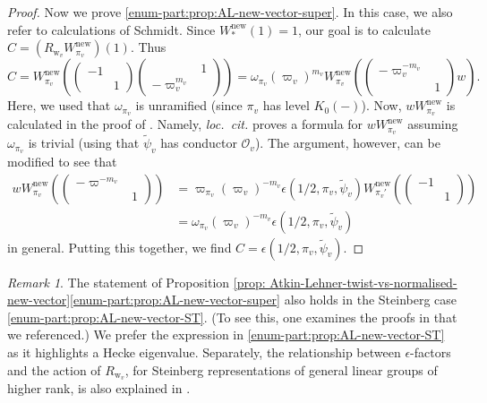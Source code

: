 \documentclass[10pt, twoside]{amsart}
\theoremstyle{plain}
\theoremstyle{definition}
\theoremstyle{remark}
\newtheorem{remark}[theorem]{Remark}
\numberwithin{equation}{subsection}
\def\new{\mathrm{new}}
\def\scro{\mathscr O}
\def\scro{\mathscr O}
\begin{document}
\begin{proof}
Now we prove \ref{enum-part:prop:AL-new-vector-super}. In this case, we also refer to calculations of Schmidt. Since $W_{\ast}^{\new}(1) = 1$, our goal is to calculate $C = (R_{{ \boldsymbol{\mathrm{w}}}_v}W_{\pi_v}^{\new})(1)$. Thus
\begin{equation*}
C = W_{\pi_v}^{\new}\left(\begin{pmatrix}-1 \\ & 1 \end{pmatrix}\begin{pmatrix} & 1 \\ -\varpi_v^{m_v} \end{pmatrix}\right) = \omega_{\pi_v}(\varpi_v)^{m_v}W_{\pi_v}^{\new}\left(\begin{pmatrix} -\varpi_v^{-m_v} \\ & 1 \end{pmatrix} w\right).
\end{equation*}
Here, we used that $\omega_{\pi_v}$ is unramified (since $\pi_v$ has level $K_0(-)$). Now, $wW_{\pi_v}^{\new}$ is calculated in the proof of \cite[Theorem 3.2.2]{Schmidt}. Namely, {\em loc.\ cit.} proves a formula for $wW_{\pi_v}^{\new}$ assuming $\omega_{\pi_v}$ is trivial (using that $\widetilde \psi_v$ has conductor $\scro_v$). The argument, however, can be modified to see that 
\begin{align*}
wW_{\pi_v}^{\new}\left(\begin{pmatrix} -\varpi^{-m_v} \\ & 1 \end{pmatrix}\right) &= \varpi_{\pi_v}(\varpi_v)^{-m_v}\epsilon(1/2,\pi_v,\widetilde \psi_v)W_{\pi_v'}^{\new}\left(\begin{pmatrix} -1 \\ & 1 \end{pmatrix}\right)\\ 
&= \omega_{\pi_v}(\varpi_v)^{-m_v}\epsilon(1/2,\pi_v,\widetilde \psi_v)
\end{align*}
in general. Putting this together, we find $C = \epsilon(1/2,\pi_v,\widetilde\psi_v)$.
\end{proof}

\begin{remark}\label{remark:steinberg-epsilon}
The statement of Proposition \ref{prop: Atkin-Lehner-twist-vs-normalised-new-vector}\ref{enum-part:prop:AL-new-vector-super} also holds in the Steinberg case \ref{enum-part:prop:AL-new-vector-ST}. (To see this, one examines the proofs in \cite{Schmidt} that we referenced.) We prefer the expression in \ref{enum-part:prop:AL-new-vector-ST} as it highlights a Hecke eigenvalue. Separately, the relationship between $\epsilon$-factors and the action of $R_{{ \boldsymbol{\mathrm{w}}}_v}$, for Steinberg representations of general linear groups of higher rank, is also explained in \cite{KondoYasuda}.
\end{remark}
\end{document}

